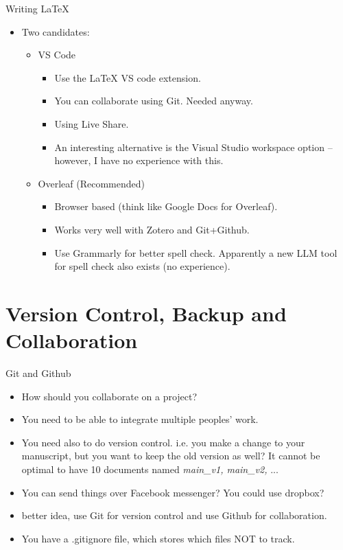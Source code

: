 \documentclass{beamer}
\begin{document}
\begin{frame}{Writing LaTeX}
\begin{itemize}
    \item Two candidates:
    \begin{itemize}
        \item VS Code
        \begin{itemize}
            \item Use the LaTeX VS code extension.
            \item You can collaborate using Git. Needed anyway.
            \item Using Live Share.
            \item An interesting alternative is the Visual Studio workspace option – however, I have no experience with this.
        \end{itemize}
        \item Overleaf (Recommended)
            \begin{itemize}
                \item Browser based (think like Google Docs for Overleaf).
                \item Works very well with Zotero and Git+Github.
                \item Use Grammarly for better spell check. Apparently a new LLM tool for spell check also exists (no experience).
            \end{itemize}
    \end{itemize}
\end{itemize}
\end{frame}

\section{Version Control, Backup and Collaboration}

\begin{frame}{Git and Github}
\begin{itemize}
    \item How should you collaborate on a project?
    \item You need to be able to integrate multiple peoples' work.
    \item You need also to do version control. i.e. you make a change to your manuscript, but you want to keep the old version as well? It cannot be optimal to have 10 documents named \textit{main\_v1, main\_v2,} ...
    \item You can send things over Facebook messenger? You could use dropbox?
    \item better idea, use Git for version control and use Github for collaboration.
    \item You have a .gitignore file, which stores which files NOT to track.
\end{itemize}
\end{frame}
\end{document}
